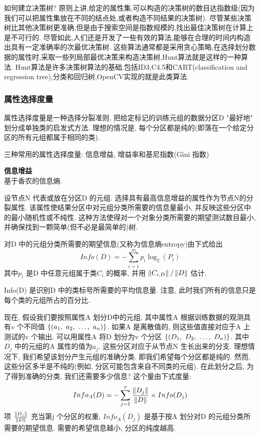 \documentclass{article}
\begin{document}
如何建立决策树?
原则上讲,给定的属性集,可以构造的决策树的数目达指数级(因为我们可以把属性集放在不同的结点处,或者构造不同结果的决策树).
尽管某些决策树比其他决策树更准确,但是由于搜索空间是指数规模的,找出最佳决策树在计算上是不可行的.
尽管如此,人们还是开发了一些有效的算法,能够在合理的时间内构造出具有一定准确率的次最优决策树.
这些算法通常都是采用贪心策略,在选择划分数据的属性时,采取一些列局部最优决策来构造决策树,Hunt算法就是这样的一种算法.
Hunt算法是许多决策树算法的基础,包括ID3,C4.5和CART(classification and regression tree),分类和回归树,OpenCV实现的就是此类算法.

\subsubsection{属性选择度量}
属性选择度量是一种选择分裂准则, 把给定标记的训练元组的数据分区D "最好地" 划分成单独类的启发式方法. 理想的情况是, 每个分区都是纯的(即落在一个给定分区的所有元组都属于相同的类).

三种常用的属性选择度量: 信息增益, 增益率和基尼指数(Gini 指数)

\textbf{信息增益}\\
基于香农的信息熵.

设节点N 代表或放在分区D 的元组. 选择具有最高信息增益的属性作为节点N的分裂属性. 该属性使结果分区中对元组分类所需要的信息量最小, 并反映这些分区中的最小随机性或不纯性.
这种方法使得对一个对象分类所需要的期望测试数目最小, 并确保找到一颗简单(但不必是最简单的)树.

对D 中的元组分类所需要的期望信息(又称为信息熵entropy)由下式给出
$$
Info(D) = - \sum_{i = 1}^m p_i \log_2 (P_i)
$$
其中$p_i$ 是D 中任意元组属于类$C_i$ 的概率, 并用 $\left\Vert C_{i,D}\right\Vert / \left\Vert D\right\Vert$ 估计.\par
Info(D) 是识别D 中的类标号所需要的平均信息量. 注意, 此时我们所有的信息只是每个类的元组所占的百分比.

现在, 假设我们要按照属性A 划分D中的元组, 其中属性A 根据训练数据的观测具有$v$ 个不同值
$\{ (a_1,~a_2,~\ldots,~a_n) \}$. 
如果A 是离散值的, 则这些值直接对应于A 上测试的v 个输出.
可以用属性A 将D 划分为v 个分区
$\{ (D_1,~D_2,~\ldots,~D_n) \}$. 
其中$D_j$ 中的元组的A 属性的值为$a_j$. 这些分区对应于从节点N 生长出来的分支. 理想情况下, 我们希望该划分产生元组的准确分类. 即我们希望每个分区都是纯的.
然而, 这些分区多半是不纯的(例如, 分区可能包含来自不同类的元组). 在此划分之后, 为了得到准确的分类, 我们还需要多少信息? 这个量由下式度量:
$$
Info_A(D) = - \sum_{j = 1}^v \frac{\left\Vert D_j\right\Vert}{\left\Vert D\right\Vert} \times Info(D_j)
$$
项 $\frac{\left\Vert D_j\right\Vert}{\left\Vert D\right\Vert}$ 充当第j 个分区的权重, $Info_A(D_j)$ 是基于按A 划分对D 的元组分类所需要的期望信息. 需要的希望信息越小, 分区的纯度越高.
\end{document}

